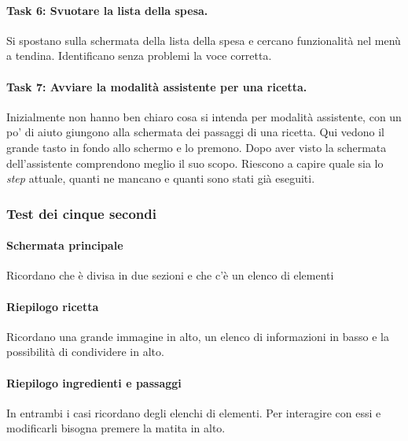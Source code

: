 \paragraph{Task 6: Svuotare la lista della spesa.}
Si spostano sulla schermata della lista della spesa e cercano funzionalità nel menù a tendina.
Identificano senza problemi la voce corretta.

\paragraph{Task 7: Avviare la modalità assistente per una ricetta.}
Inizialmente non hanno ben chiaro cosa si intenda per modalità assistente, con un po' di aiuto giungono alla schermata dei passaggi di una ricetta.
Qui vedono il grande tasto in fondo allo schermo e lo premono.
Dopo aver visto la schermata dell'assistente comprendono meglio il suo scopo.
Riescono a capire quale sia lo \textit{step} attuale, quanti ne mancano e quanti sono stati già eseguiti.

\clearpage
\subsubsection{Test dei cinque secondi}
\paragraph{Schermata principale}
Ricordano che è divisa in due sezioni e che c'è un elenco di elementi

\paragraph{Riepilogo ricetta}
Ricordano una grande immagine in alto, un elenco di informazioni in basso e la possibilità di condividere in alto.

\paragraph{Riepilogo ingredienti e passaggi}
In entrambi i casi ricordano degli elenchi di elementi.
Per interagire con essi e modificarli bisogna premere la matita in alto.
